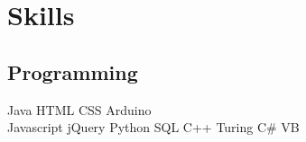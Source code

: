 \documentclass[]{deedy-resume-openfont}
\begin{document}
\begin{minipage}[t]{0.33\textwidth}




\section{Skills}
\subsection{Programming}
Java \textbullet{} HTML \textbullet{} CSS \textbullet{} Arduino \\  %
\vspace{1mm}
Javascript  \textbullet{} jQuery \textbullet{} Python \textbullet{} SQL\hspace{10mm} C++ \textbullet{} Turing \textbullet{} C\# \textbullet{} VB\\
\vspace{1mm}
\sectionsep


\end{minipage}
\end{document}
